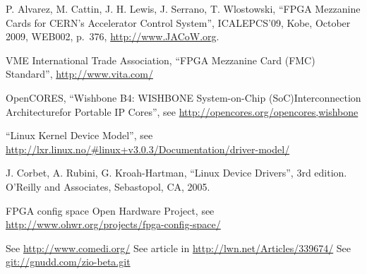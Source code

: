 \documentclass{JAC2003}
\begin{document}
\begin{thebibliography}{9}   %

P. Alvarez, M. Cattin, J. H. Lewis, J. Serrano, T. Wlostowski,
``FPGA Mezzanine Cards for CERN’s Accelerator Control System'',
ICALEPCS'09, Kobe, October 2009, WEB002, p.~376,
\url{http://www.JACoW.org}.

VME International Trade Association,
``FPGA Mezzanine Card (FMC) Standard'', \url{http://www.vita.com/}

OpenCORES,
``Wishbone B4: WISHBONE System-on-Chip (SoC)Interconnection
Architecturefor Portable IP Cores'',
see \url{http://opencores.org/opencores,wishbone}

``Linux Kernel Device Model'',
see \url{http://lxr.linux.no/#linux+v3.0.3/Documentation/driver-model/}

J. Corbet, A. Rubini, G. Kroah-Hartman, ``Linux Device Drivers'', 3rd
edition. O'Reilly and Associates, Sebastopol, CA, 2005.

 FPGA config space Open Hardware
Project, see
\url{http://www.ohwr.org/projects/fpga-config-space/}

 See \url{http://www.comedi.org/}
 See article in \url{http://lwn.net/Articles/339674/}
 See \url{git://gnudd.com/zio-beta.git}

\end{thebibliography}
\end{document}
